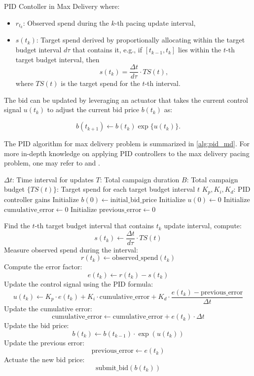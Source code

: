 \documentclass[../main.tex]{subfiles}
\begin{document}
\begin{section}{PID Contoller in Max Delivery}
		where:
		\begin{itemize}
			\item \(r_{t_k}\): Observed spend during the \(k\)-th pacing update interval,
			\item \(s(t_k)\): Target spend derived by proportionally allocating within the target budget interval \(d\tau\) that contains it, e.g., if \([t_{k-1}, t_k]\) lies within the \(t\)-th target budget interval, then 
			\[
			s(t_k) = \frac{\Delta t}{d\tau} \cdot TS(t),
			\]
			where \(TS(t)\) is the target spend for the \(t\)-th interval.
			
		\end{itemize}
		
		The bid can be updated by leveraging an actuator that takes the current control signal \(u(t_k)\) to adjust the current bid price \(b(t_k)\) as:
		
		\[
		b(t_{k+1}) \gets b(t_k) \exp\{u(t_{k})\}.
		\]
		
		The PID algorithm for max delivery problem is summarized in \autoref{alg:pid_md}. For more in-depth knowledge on applying PID controllers to the max delivery pacing problem, one may refer to  \cite{wang2017display} and \cite{zhang2016feedback}.
		
		\begin{algorithm}
			\caption{PID Controller for Bid Price Modulation in Max Delivery}
			\label{alg:pid_md}
			\begin{algorithmic}[1]
				\Require $\Delta t$: Time interval for updates
				\Require $T$: Total campaign duration
				\Require $B$: Total campaign budget
				\Require $\{ TS(t) \}$: Target spend for each target budget interval $t$
				\Require $K_p, K_i, K_d$: PID controller gains
				\State Initialize $b(0) \gets \text{initial\_bid\_price}$
				\State Initialize $u(0) \gets 0$
				\State Initialize $\text{cumulative\_error} \gets 0$
				\State Initialize $\text{previous\_error} \gets 0$
				
				 
				\State Find the $t$-th target budget interval that contains $t_k$ update interval, compute:
				\[
				s(t_k) \gets \frac{\Delta t}{d\tau} \cdot TS(t)
				\]
				\State Measure observed spend during the interval:
				\[
				r(t_k) \gets \text{observed\_spend}(t_k)
				\]
				\State Compute the error factor:
				\[
				e(t_k) \gets r(t_k) - s(t_k)
				\]
				\State Update the control signal using the PID formula:
				\[
				u(t_k) \gets K_p \cdot e(t_k) + K_i \cdot \text{cumulative\_error} + K_d \cdot \frac{e(t_k) - \text{previous\_error}}{\Delta t}
				\]
				\State Update the cumulative error:
				\[
				\text{cumulative\_error} \gets \text{cumulative\_error} + e(t_k) \cdot \Delta t
				\]
				\State Update the bid price:
				\[
				b(t_k) \gets b(t_{k-1}) \cdot \exp(u(t_k))
				\]
				\State Update the previous error:
				\[
				\text{previous\_error} \gets e(t_k)
				\]
				\State Actuate the new bid price:
				\[
				\text{submit\_bid}(b(t_k))
				\]
				\EndFor
			\end{algorithmic}
		\end{algorithm}
		

\end{section}
\end{document}
